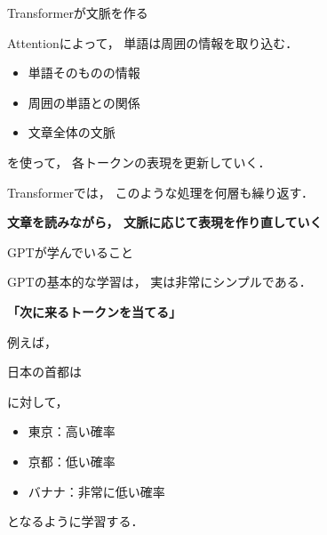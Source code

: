 \documentclass[aspectratio=169,professionalfonts]{beamer}
\begin{document}
\begin{frame}{Transformerが文脈を作る}

  Attentionによって，
  単語は周囲の情報を取り込む．

  \vspace{1em}

  \begin{itemize}
    \item 単語そのものの情報
    \item 周囲の単語との関係
    \item 文章全体の文脈
  \end{itemize}

  を使って，
  各トークンの表現を更新していく．

  \vspace{1em}

  Transformerでは，
  このような処理を何層も繰り返す．

  \vspace{1em}

  \begin{center}
    \textbf{文章を読みながら，
    文脈に応じて表現を作り直していく}
  \end{center}


\end{frame}


\begin{frame}{GPTが学んでいること}

  GPTの基本的な学習は，
  実は非常にシンプルである．

  \vspace{1em}

  \begin{center}
    \textbf{「次に来るトークンを当てる」}
  \end{center}

  \vspace{1em}

  例えば，

  \begin{center}
    日本の首都は \underline{\hspace{3em}}
  \end{center}

  に対して，

  \begin{itemize}
    \item 東京：高い確率
    \item 京都：低い確率
    \item バナナ：非常に低い確率
  \end{itemize}

  となるように学習する．


\end{frame}
\end{document}
